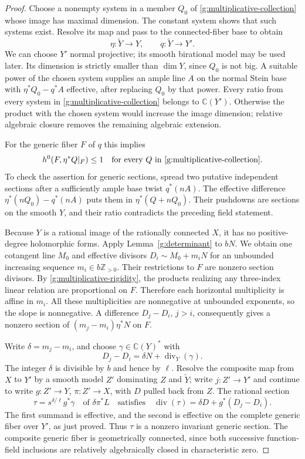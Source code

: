 \begin{proof}
Choose a nonempty system in a member $Q_0$ of
\eqref{g:multiplicative-collection} whose image has maximal dimension.
The constant system shows that such systems exist. Resolve its map and
pass to the connected-fiber base to obtain
\[
 \eta:\widetilde Y\to Y,\qquad q:\widetilde Y\to Y'.
\]
We can choose $Y'$ normal projective; its smooth birational model may
be used later. Its dimension is strictly smaller than $\dim Y$, since
$Q_0$ is not big. A suitable power of the chosen system supplies an
ample line $A$ on the normal Stein base with
$\eta^*Q_0-q^*A$ effective, after replacing $Q_0$ by that power.
Every ratio from every system in
\eqref{g:multiplicative-collection} belongs to $\mathbb C(Y')$.
Otherwise the product with the chosen system would increase the image
dimension; relative algebraic closure removes the remaining algebraic
extension.

For the generic fiber $F$ of $q$ this implies
\begin{equation}\label{g:multiplicative-rigidity}
 h^0(F,\eta^*Q|_F)\leq1
 \quad\text{for every }Q\text{ in }
 \eqref{g:multiplicative-collection}.
\end{equation}
To check the assertion for generic sections, spread two putative
independent sections after a sufficiently ample base twist $q^*(nA)$.
The effective difference $\eta^*(nQ_0)-q^*(nA)$ puts them in
$\eta^*(Q+nQ_0)$. Their pushdowns are sections on the smooth $Y$,
and their ratio contradicts the preceding field statement.

Because $Y$ is a rational image of the rationally connected $X$, it
has no positive-degree holomorphic forms. Apply
Lemma~\ref{g:determinant} to $bN$. We obtain one cotangent line $M_0$
and effective divisors $D_i\sim M_0+m_iN$ for an unbounded increasing
sequence $m_i\in b\mathbb Z_{>0}$. Their restrictions to $F$ are
nonzero section divisors. By \eqref{g:multiplicative-rigidity}, the
products realizing any three-index linear relation are proportional
on $F$. Therefore each horizontal multiplicity is affine in $m_i$.
All these multiplicities are nonnegative at unbounded exponents, so
the slope is nonnegative. A difference $D_j-D_i$, $j>i$, consequently
gives a nonzero section of $(m_j-m_i)\eta^*N$ on $F$.

Write $\delta=m_j-m_i$, and choose $\gamma\in\mathbb C(Y)^*$ with
\[
 D_j-D_i=\delta N+\operatorname{div}_Y(\gamma).
\]
The integer $\delta$ is divisible by $b$ and hence by $\ell$.
Resolve the composite map from $X$ to $Y'$ by a smooth model $Z'$
dominating $Z$ and $\widetilde Y$; write $j:Z'\to Y'$ and continue
to write $g:Z'\to Y$, $\pi:Z'\to X$, with $D$ pulled back from $Z$.
The rational section
\[
 \tau=s^{\delta/\ell}g^*\gamma\quad\text{of }\delta\pi^*L
 \quad\text{satisfies}\quad
 \operatorname{div}(\tau)=\delta D+g^*(D_j-D_i).
\]
The first summand is effective, and the second is effective on the
complete generic fiber over $Y'$, as just proved. Thus $\tau$ is a
nonzero invariant generic section. The composite generic fiber is geometrically
connected, since both successive function-field inclusions are
relatively algebraically closed in characteristic zero.


\end{proof}
